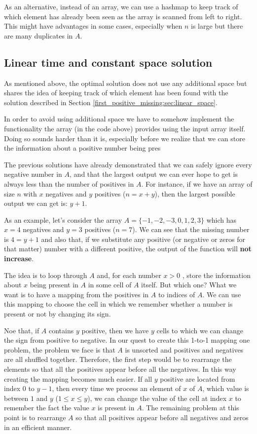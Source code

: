As an alternative, instead of an array, we can use a hashmap to keep track of which element has
already been seen as the array is scanned from left to right. This might have advantages in some cases, especially when $n$ is large but there are many duplicates in $A$. 


\subsection{Linear time and constant space solution}
\label{first_positive_missing:sec:constant_space}

As mentioned above, the optimal solution does not use any additional space but shares the idea of keeping track of which
element has been found with the solution described in Section \ref{first_positive_missing:sec:linear_space}. 

In order to avoid using additional space we have to somehow implement the functionality the array  (in the code above) provides using the input array itself. Doing so sounds harder than it is, especially before we realize that we can store the information about a positive number being pres

The previous solutions have already demonstrated that we can safely ignore every negative number in $A$, and that the largest output we can ever hope to get is always less than the number of positives in $A$. For instance, if we have an array of size $n$ with $x$ negatives and $y$ positives ($n=x+y$), then the largest possible output we can get is: $y+1$. 

As an example, let's consider the array $A=\{-1, -2, -3, 0, 1, 2, 3\}$ which has $x=4$ negatives and $y=3$ positives ($n=7$). We can see that the missing number is $4=y+1$ and also that, if we substitute any positive (or negative or zeros for that matter) number with a different positive, the output of the function will \textbf{not increase}. 

The idea is to loop through $A$ and, for each number $x>0$ , store the information about $x$ being present in $A$ in some cell of $A$ itself. But which one? What we want is to have a mapping from the positives in $A$ to indices of $A$. We can use this mapping to choose the cell in which we remember whether a number is present or not by changing its sign.

Noe that, if $A$ contains $y$ positive, then we have $y$ cells to which we can change the sign from positive to negative. In our quest to create this 1-to-1 mapping one problem, the problem we face is that $A$ is unsorted and positives and negatives are all shuffled together. Therefore, the first step would be to rearrange the elements so that all the positives appear before all the negatives. In this way creating the mapping becomes much easier. If all $y$ positive are located from index $0$ to $y-1$, then every time we process an element of $x$ of $A$, which value is between $1$ and $y$ ($1 \leq x \leq y$), we can change the value of the cell at index $x$ to remember the fact the value $x$ is present in $A$. The remaining problem at this point is to rearrange $A$ so that all positives appear before all negatives and zeros in an efficient manner.


